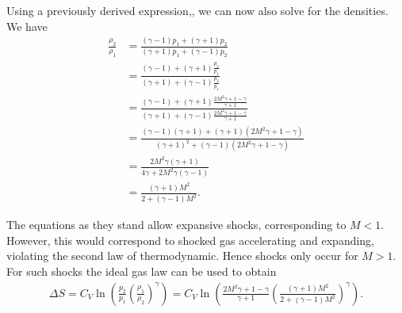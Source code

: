 Using a previously derived expression,, we can now also solve for the densities. We have
\begin{align*}
	\frac{\rho_{2}}{\rho_{1}} &= \frac{(\gamma - 1)p_{1} + (\gamma + 1)p_{2}}{(\gamma + 1)p_{1} + (\gamma - 1)p_{2}} \\
	                          &= \frac{(\gamma - 1) + (\gamma + 1)\frac{p_{2}}{p_{1}}}{(\gamma + 1) + (\gamma - 1)\frac{p_{2}}{p_{1}}} \\
	                          &= \frac{(\gamma - 1) + (\gamma + 1)\frac{2M^{2}\gamma + 1 - \gamma}{\gamma + 1}}{(\gamma + 1) + (\gamma - 1)\frac{2M^{2}\gamma + 1 - \gamma}{\gamma + 1}} \\
	                          &= \frac{(\gamma - 1)(\gamma + 1) + (\gamma + 1)(2M^{2}\gamma + 1 - \gamma)}{(\gamma + 1)^{2} + (\gamma - 1)(2M^{2}\gamma + 1 - \gamma)} \\
	                          &= \frac{2M^{2}\gamma(\gamma + 1)}{4\gamma + 2M^{2}\gamma(\gamma - 1)} \\
	                          &= \frac{(\gamma + 1)M^{2}}{2 + (\gamma - 1)M^{2}}.
\end{align*}

The equations as they stand allow expansive shocks, corresponding to $M < 1$. However, this would correspond to shocked gas accelerating and expanding, violating the second law of thermodynamic. Hence shocks only occur for $M > 1$. For such shocks the ideal gas law can be used to obtain
\begin{align*}
	\Delta S = C_{V}\ln(\frac{p_{2}}{p_{1}}\left(\frac{\rho_{1}}{\rho_{2}}\right)^{\gamma}) = C_{V}\ln(\frac{2M^{2}\gamma + 1 - \gamma}{\gamma + 1}\left(\frac{(\gamma + 1)M^{2}}{2 + (\gamma - 1)M^{2}}\right)^{\gamma}).
\end{align*}